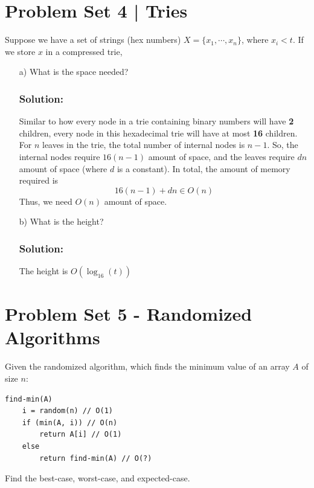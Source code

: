 \documentclass{report}
\begin{document}
\section*{Problem Set 4 | Tries}
Suppose we have a set of strings (hex numbers) $X = \{x_1, \cdots, x_n\}$, where $x_i < t$. If we store $x$ in a compressed trie,
\begin{itemize}
\item[a)] What is the space needed?
\subsubsection{Solution:}
Similar to how every node in a trie containing binary numbers will have \textbf{2} children, every node in this hexadecimal trie will have at most \textbf{16} children. For $n$ leaves in the trie, the total number of internal nodes is $n-1$. So, the internal nodes require $16(n-1)$ amount of space, and the leaves require $dn$ amount of space (where $d$ is a constant). In total, the amount of memory required is
$$16(n-1) + dn \in O(n)$$
Thus, we need $O(n)$ amount of space.
\item[b)] What is the height?
\subsubsection{Solution:}
The height is $O(\log_{16} (t))$
\end{itemize}
\section*{Problem Set 5 - Randomized Algorithms}
Given the randomized algorithm, which finds the minimum value of an array $A$ of size $n$:
\begin{lstlisting}
find-min(A)
	i = random(n) // O(1)
	if (min(A, i)) // O(n)
		return A[i] // O(1)
	else
		return find-min(A) // O(?)
\end{lstlisting}
Find the best-case, worst-case, and expected-case.
\end{document}
